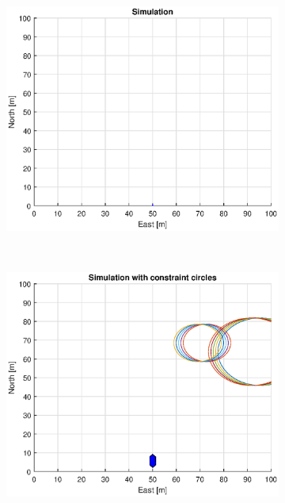 \begin{figure}[!b]
\begin{subfigure}[b]{0.499\textwidth}
        \includegraphics[width=\textwidth]{Images/Figures/Enkel_GW/Simple0_f600_Frame1}
    \end{subfigure}
    \hfill
    \\
    \begin{subfigure}[b]{0.49\textwidth}
        \centering
        \includegraphics[width=\textwidth]{Images/Figures/Enkel_GW/Simple0_f1_Frame2}
    \end{subfigure}
    \hfill
    \begin{subfigure}[b]{0.499\textwidth}

\end{subfigure}
\end{figure}
